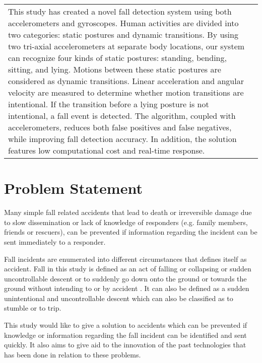 \begin{center}
{\begin{tabularx}{\textwidth}{p{}|p{}}
This study has created a novel fall detection system using both accelerometers and gyroscopes. Human activities are divided into two categories: static postures and dynamic transitions. By using two tri-axial accelerometers at separate body locations, our system can recognize four kinds of static postures: standing, bending, sitting, and lying. Motions between these static postures are considered as dynamic transitions. Linear acceleration and angular velocity are measured to determine whether motion transitions are intentional. If the transition before a lying posture
is not intentional, a fall event is detected. The algorithm, coupled with accelerometers, reduces both false positives and false negatives, while improving fall detection accuracy. In addition, the solution features low computational cost and real-time response. 
  \\

\end{tabularx}
}
\end{center}

\section{Problem Statement}
\label{sec:statement}

Many simple fall related accidents that lead to death or irreversible damage due to slow dissemination or lack of knowledge of responders (e.g. family members, friends or rescuers), can be prevented if information regarding the incident can be sent immediately to a responder.

Fall incidents are enumerated into different circumstances that defines itself as accident. \gls{Fall} in this study is defined as an act of falling or collapsing or sudden uncontrollable descent or to suddenly go down onto the ground or towards the ground without intending to or by accident  \cite{Cam17}. %
It can also be defined as a sudden unintentional and uncontrollable descent which can also be classified as to stumble or to trip.  

This study would like to give a solution to accidents which can be prevented if knowledge or information regarding the fall incident can be identified and sent quickly. It also aims to give aid to the innovation of the past technologies that has been done in relation to these problems.

